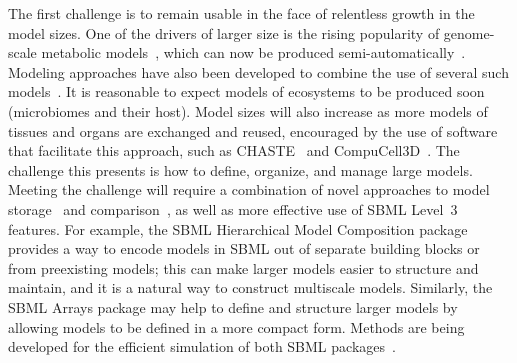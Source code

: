 \documentclass{sbml-paper}
\begin{document}
The first challenge is to remain usable in the face of relentless growth in the model sizes.  One of the drivers of larger size is the rising popularity of genome-scale metabolic models~\citep{Bordbar2014a}, which can now be produced semi-automatically~\citep{henry2010high, buchel2013path2models, Magnusdottir2017}.  Modeling approaches have also been developed to combine the use of several such models~\citep[e.g.,][]{bordbar2011multi}.  It is reasonable to expect models of ecosystems to be produced soon (\eg microbiomes and their host).  Model sizes will also increase as more models of tissues and organs are exchanged and reused, encouraged by the use of software that facilitate this approach, such as CHASTE~\citep{mirams2013chaste} and CompuCell3D~\citep{swat2012multi}.  The challenge this presents is how to define, organize, and manage large models.  Meeting the challenge will require a combination of novel approaches to model storage~\citep[e.g.,][]{Henkel2015combininga} and comparison~\citep[e.g.,][]{Scharm2016algorithm, Scharm2016comodi}, as well as more effective use of SBML Level~3 features.  For example, the SBML Hierarchical Model Composition package~\citep{Smith2015} provides a way to encode models in SBML out of separate building blocks or from preexisting models; this can make larger models easier to structure and maintain, and it is a natural way to construct multiscale models.  Similarly, the SBML Arrays package may help to define and structure larger models by allowing models to be defined in a more compact form.  Methods are being developed for the efficient simulation of both SBML packages~\citep{watanabe2014hierarchical, watanabe2016efficient}.
\end{document}
